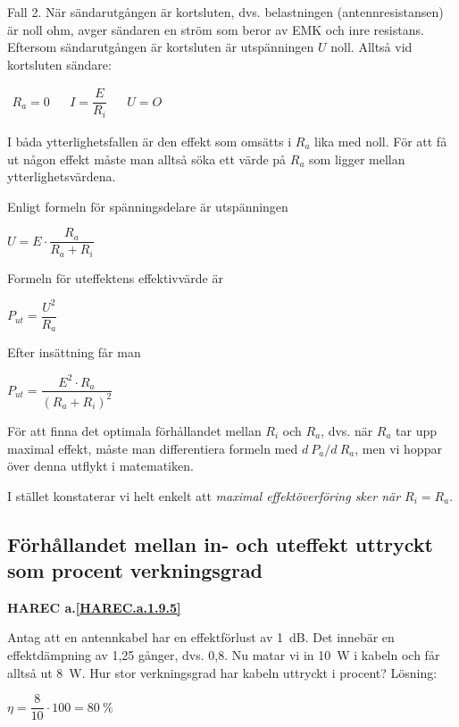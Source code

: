 Fall 2.
När sändarutgången är kortsluten, dvs. belastningen (antennresistansen) är
noll ohm, avger sändaren en ström som beror av EMK och inre resistans.
Eftersom sändarutgången är kortsluten är utspänningen \(U\) noll.
Alltså vid kortsluten sändare:

\(
\begin{array}{lllll}
R_a = 0 & & I = \dfrac{E}{R_i} & & U = O
\end{array}
\)

I båda ytterlighetsfallen är den effekt som omsätts i \(R_a\) lika med noll.
För att få ut någon effekt måste man alltså söka ett värde på \(R_a\) som
ligger mellan ytterlighetsvärdena.

Enligt formeln för spänningsdelare är utspänningen

\(U = E \cdot \dfrac{R_a}{R_a+R_i}\)

Formeln för uteffektens effektivvärde är

\(P_{ut} = \dfrac{U^2}{R_a}\)

Efter insättning får man

\(P_{ut} = \dfrac{E^2 \cdot R_a}{(R_a + R_i)^2}\)

För att finna det optimala förhållandet mellan \(R_i\) och \(R_a\), dvs. när
\(R_a\) tar upp maximal effekt, måste man differentiera formeln med \(d\ P_a/d\ R_a\), men vi hoppar över denna utflykt i matematiken.

I stället konstaterar vi helt enkelt att \emph{maximal effektöverföring sker när
\(R_i = R_a\)}.

\subsection{Förhållandet mellan in- och uteffekt uttryckt som procent verkningsgrad}
\textbf{HAREC a.\ref{HAREC.a.1.9.5}\label{myHAREC.a.1.9.5}}

Antag att en antennkabel har en effektförlust av 1~dB.
Det innebär en effektdämpning av 1,25 gånger, dvs. 0,8.
Nu matar vi in 10~W i kabeln och får alltså ut 8~W.
Hur stor verkningsgrad har kabeln uttryckt i procent?
Lösning:

\(\eta = \dfrac{8}{10} \cdot 100 = 80\ \%\)
